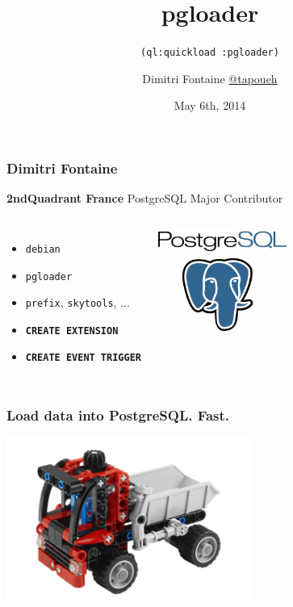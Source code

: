 \documentclass{beamer}
\title{pgloader}
\subtitle{\texttt{(ql:quickload :pgloader)}}
\author{Dimitri Fontaine \linebreak \url{@tapoueh}}
\date{May 6th, 2014}
\begin{document}
\frame{\titlepage}

\begin{frame}[fragile]
  \frametitle{Dimitri Fontaine}

  \begin{center}
    \textbf{2ndQuadrant France}
    \linebreak
    PostgreSQL Major Contributor
  \end{center}
  \vfill

\begin{columns}[c]

  \begin{itemize}
   \item \texttt{debian}
   \item \texttt{pgloader}
   \item \texttt{prefix}, \texttt{skytools}, ...
   \item \texttt{\textbf{CREATE EXTENSION}}
   \item \texttt{\textbf{CREATE EVENT TRIGGER}}
  \end{itemize}  

\begin{center}
  \includegraphics[height=9em]{postgres-logo.png}
\end{center}
\end{columns}
\end{frame}

\begin{frame}
  \frametitle{Load data into PostgreSQL. Fast.}


  \begin{center}
    \includegraphics[height=2.1in]{pgloader.jpg}
  \end{center}
\end{frame}
\end{document}
